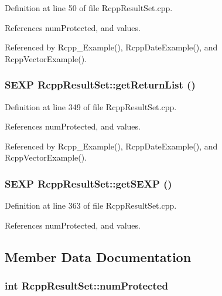 Definition at line 50 of file RcppResultSet.cpp.

References numProtected, and values.

Referenced by Rcpp\_\-Example(), RcppDateExample(), and RcppVectorExample().\hypertarget{classRcppResultSet_a916989ff6c0ed1149a5f93fb6a532946}{
\subsubsection[{getReturnList}]{\setlength{\rightskip}{0pt plus 5cm}SEXP RcppResultSet::getReturnList ()}}
\label{classRcppResultSet_a916989ff6c0ed1149a5f93fb6a532946}


Definition at line 349 of file RcppResultSet.cpp.

References numProtected, and values.

Referenced by Rcpp\_\-Example(), RcppDateExample(), and RcppVectorExample().\hypertarget{classRcppResultSet_a372bdf017661811062631e0c9f1f5083}{
\subsubsection[{getSEXP}]{\setlength{\rightskip}{0pt plus 5cm}SEXP RcppResultSet::getSEXP ()}}
\label{classRcppResultSet_a372bdf017661811062631e0c9f1f5083}


Definition at line 363 of file RcppResultSet.cpp.

References numProtected, and values.

\subsection{Member Data Documentation}
\hypertarget{classRcppResultSet_a19edd02ac05783f9b4fd840c22e74153}{
\subsubsection[{numProtected}]{\setlength{\rightskip}{0pt plus 5cm}int {\bf RcppResultSet::numProtected}}}
\label{classRcppResultSet_a19edd02ac05783f9b4fd840c22e74153}


